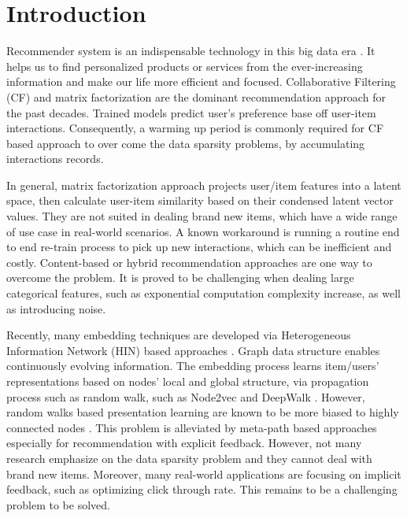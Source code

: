 \section{Introduction}

Recommender system is an indispensable technology in this big data era \cite{lu2015recommender}. It helps us to find personalized products or services from the ever-increasing information and make our life more efficient and focused. Collaborative Filtering (CF) and matrix factorization are the dominant recommendation approach for the past decades. Trained models predict user's preference base off user-item interactions. Consequently, a warming up period is commonly required for CF based approach to over come the data sparsity problems, by accumulating interactions records.

In general, matrix factorization approach projects user/item features into a latent space, then calculate user-item similarity based on their condensed latent vector values. They are not suited in dealing brand new items, which have a wide range of use case in real-world scenarios. A known workaround is running a routine end to end re-train process to pick up new interactions, which can be inefficient and costly. Content-based or hybrid recommendation approaches are one way to overcome the problem. It is proved to be challenging when dealing large categorical features, such as exponential computation complexity increase, as well as introducing noise.

Recently, many embedding techniques are developed via Heterogeneous Information Network (HIN) based approaches \cite{mao2016multirelational,wang2016member}. Graph data structure enables continuously evolving information. The embedding process learns item/users' representations based on nodes' local and global structure, via propagation process such as random walk, such as Node2vec \cite{grover2016node2vec} and DeepWalk \cite{perozzi2014deepwalk}. However, random walks based presentation learning are known to be more biased to highly connected nodes \cite{sun2011pathsim}. This problem is alleviated by meta-path based approaches \cite{dong2017metapath2vec} especially for recommendation with explicit feedback. However, not many research emphasize on the data sparsity problem and they cannot deal with brand new items. Moreover, many real-world applications are focusing on implicit feedback, such as optimizing click through rate. This remains to be a challenging problem to be solved.

